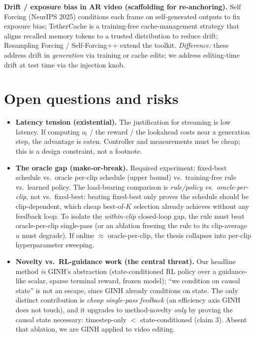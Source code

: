 \documentclass{article}
\begin{document}
\textbf{Drift / exposure bias in AR video (scaffolding for re-anchoring).}
Self Forcing (NeurIPS 2025) conditions each frame on self-generated outputs to fix exposure
bias; TetherCache is a training-free cache-management strategy that aligns recalled memory
tokens to a trusted distribution to reduce drift; Resampling Forcing / Self-Forcing++ extend
the toolkit. \emph{Difference:} these address drift in \emph{generation} via training or cache
edits; we address editing-time drift at test time via the injection knob.

\section{Open questions and risks}

\begin{itemize}
  \item \textbf{Latency tension (existential).} The justification for streaming is low latency.
        If computing $o_t$ / the reward / the lookahead costs near a generation step, the
        advantage is eaten. Controller and measurements must be cheap; this is a design
        constraint, not a footnote.
  \item \textbf{The oracle gap (make-or-break).} Required experiment: fixed-best schedule vs.\
        oracle per-clip schedule (upper bound) vs.\ training-free rule vs.\ learned policy. The
        load-bearing comparison is \emph{rule/policy vs.\ oracle-per-clip}, not vs.\ fixed-best:
        beating fixed-best only proves the schedule should be clip-dependent, which cheap
        best-of-$K$ selection already achieves without any feedback loop. To isolate the
        \emph{within-clip} closed-loop gap, the rule must beat oracle-per-clip single-pass (or
        an ablation freezing the rule to its clip-average $u$ must degrade). If online
        $\approx$ oracle-per-clip, the thesis collapses into per-clip hyperparameter sweeping.
  \item \textbf{Novelty vs.\ RL-guidance work (the central threat).} Our headline method \emph{is}
        GINH's abstraction (state-conditioned RL policy over a guidance-like scalar, sparse
        terminal reward, frozen model); ``we condition on causal state'' is not an escape, since
        GINH already conditions on state. The only distinct contribution is \emph{cheap
        single-pass feedback} (an efficiency axis GINH does not touch), and it upgrades to
        method-novelty \emph{only} by proving the causal state necessary: timestep-only $<$
        state-conditioned (claim 3). Absent that ablation, we are GINH applied to video editing.

\end{itemize}
\end{document}
